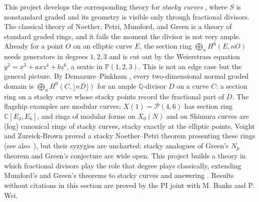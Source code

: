 \documentclass[11pt,reqno]{amsart}
\theoremstyle{remark}
\newcommand{\CC}{\mathbb{C}}
\newcommand{\PP}{\mathbb{P}}
\newcommand{\QQ}{\mathbb{Q}}
\newcommand{\cP}{\mathcal{P}}
\begin{document}
This project develops the corresponding theory for \emph{stacky curves} \cite{abramovichVistoli02,cadman07,AGV08}, where $S$ is nonstandard graded and its geometry is visible only through fractional divisors. The classical theory of Noether, Petri, Mumford, and Green is a theory of standard graded rings, and it fails the moment the divisor is not very ample. Already for a point $O$ on an elliptic curve $E$, the section ring $\bigoplus_n H^0(E,nO)$ needs generators in degrees $1,2,3$ and is cut out by the Weierstrass equation $y^2=x^3+axz^4+bz^6$, a sextic in $\PP(1,2,3)$. This is not an edge case but the general picture. By Demazure--Pinkham \cite{pinkham77,demazure88,watanabe81}, every two-dimensional normal graded domain is $\bigoplus_n H^0(C,\lfloor nD\rfloor)$ for an ample $\QQ$-divisor $D$ on a curve $C$: a section ring on a stacky curve whose stacky points record the fractional part of $D$. The flagship examples are modular curves; $X(1)=\cP(4,6)$ has section ring $\CC[E_4,E_6]$, and rings of modular forms on $X_0(N)$ and on Shimura curves are (log) canonical rings of stacky curves, stacky exactly at the elliptic points. Voight and Zureick-Brown \cite{voightZurieckBrown22} proved a stacky Noether--Petri theorem presenting these rings (see also~\cite{odorney15,LRZ16}), but their syzygies are uncharted: stacky analogues of Green's $N_p$ theorem and Green's conjecture are wide open. This project builds a theory in which fractional divisors play the role that degree plays classically, extending Mumford's and Green's theorems to stacky curves and answering \cite[Ques.~7.7]{brownErman25}. Results without citations in this section are proved by the PI joint with M. Banks and P. Wei. 
\end{document}

